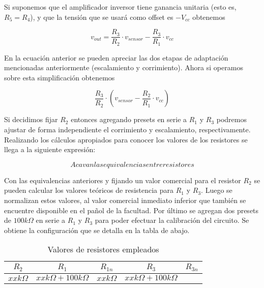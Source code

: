 Si suponemos que el amplificador inversor tiene ganancia unitaria (esto es, $R_5=R_4$), y que la tensión que se usará como offset es $-V_{cc}$ obtenemos

\begin{equation}
    v_{out}= \frac{R_3}{R_2} \cdot v_{sensor}  - \frac{R_3}{R_1} \cdot v_{cc} 
    \label{fig:EJ6_ecuacion_sistema2} 
\end{equation}

En la ecuación anterior se pueden apreciar las dos etapas de adaptación mencionadas anteriormente (escalamiento y corrimiento). Ahora si operamos sobre esta simplificación obtenemos

\begin{equation}
    \frac{R_3}{R_2} \cdot \left( v_{sensor} - \frac{R_2}{R_1} \cdot v_{cc} \right)
    \label{fig:EJ6_ecuacion_sistema_simplificada_final} 
\end{equation}

Si decidimos fijar $R_2$ entonces agregando presets en serie a $R_1$ y $R_3$ podremos ajustar de forma independiente el corrimiento y escalamiento, respectivamente.
Realizando los c\'alculos apropiados para conocer los valores de los resistores se llega a la siguiente expresi\'on:

\begin{equation}
    Aca van las equivalencias entre resistores
    \label{fig:EJ6_ecuacion_resistores}
\end{equation}

Con las equivalencias anteriores y fijando un valor comercial para el resistor $R_2$ se pueden calcular los valores teóricos de resistencia para $R_1$ y $R_3$.
  Luego se normalizan estos valores, al valor comercial inmediato inferior que tambi\'en se encuentre disponible en el pa\~nol de la facultad.
  Por \'ultimo se agregan dos presets de $100k\Omega$ en serie a $R_1$ y $R_3$ para poder efectuar la calibraci\'on del circuito. Se obtiene la configuraci\'on que se detalla en la tabla de abajo.

  \begin{table}[H]
	\begin{center}
		\begin{tabular}{c c c c c}
		$R_2$ & $R_1$ & $R_{1n}$ & $R_3$ & $R_{3n}$ \\
		\hline
		$xx k\Omega$ & $xx k\Omega + 100 k\Omega$ & $xx k\Omega$ & $xx k\Omega + 100 k\Omega$
		\end{tabular}
		
		\caption{Valores de resistores empleados}
	\end{center}
\end{table}

